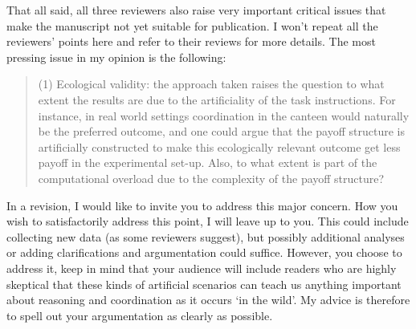 \documentclass[a4paper]{article}
\newenvironment{robin}{\smallskip \noindent \color{red!10!green!50!blue}}{\color{black}\smallskip}
\begin{document}
That all said, all three reviewers also raise very important critical issues that make the manuscript not yet suitable for publication. I won't repeat all the reviewers' points here and refer to their reviews for more details. The most pressing issue in my opinion is the following:
\begin{quote}
(1)    Ecological validity: the approach taken raises the question to what extent the results are due to the artificiality of the task instructions.
 For instance, in real world settings coordination in the canteen would naturally be the preferred outcome, and one could argue that the payoff structure is artificially constructed to make this ecologically relevant outcome get less payoff in the experimental set-up. Also, to what extent is part of the computational overload due to the complexity of the payoff structure?  
\end{quote}
In a revision, I would like to invite you to address this major concern. How you wish to satisfactorily address this point, I will leave up to you. This could include collecting new data (as some reviewers suggest), but possibly additional analyses or adding clarifications and argumentation could suffice. However, you choose to address it, keep in mind that your audience will include readers who are highly skeptical that these kinds of artificial scenarios can teach us anything important about reasoning and coordination as it occurs ‘in the wild’. My advice is therefore to spell out your argumentation as clearly as possible. 
\end{document}
